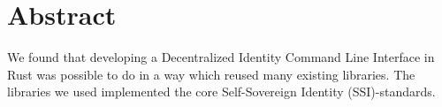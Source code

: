 \chapter*{Abstract}

We found that developing a Decentralized Identity Command Line Interface in Rust was possible to do in a way which reused many existing libraries. The libraries we used implemented the core Self-Sovereign Identity (SSI)-standards.

